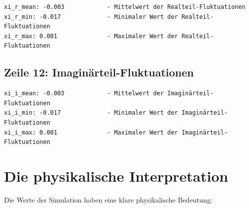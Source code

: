 \begin{verbatim}
xi_r_mean: -0.003            - Mittelwert der Realteil-Fluktuationen
xi_r_min: -0.017             - Minimaler Wert der Realteil-Fluktuationen
xi_r_max: 0.001              - Maximaler Wert der Realteil-Fluktuationen
\end{verbatim}

\subsection{Zeile 12: Imaginärteil-Fluktuationen}

\begin{verbatim}
xi_i_mean: -0.003            - Mittelwert der Imaginärteil-Fluktuationen
xi_i_min: -0.017             - Minimaler Wert der Imaginärteil-Fluktuationen
xi_i_max: 0.001              - Maximaler Wert der Imaginärteil-Fluktuationen
\end{verbatim}

\section{Die physikalische Interpretation}

Die Werte der Simulation haben eine klare physikalische Bedeutung:

